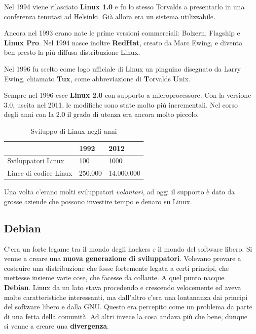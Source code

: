 Nel 1994 viene rilasciato \textbf{Linux 1.0} e fu lo stesso Torvalds a presentarlo in una conferenza tenutasi ad Helsinki. Già allora era un sistema utilizzabile.

Ancora nel 1993 erano nate le prime versioni commerciali: Bolzern, Flagship e \textbf{Linux Pro}. Nel 1994 nasce inoltre \textbf{RedHat}, creato da Marc Ewing, e diventa ben presto la più diffusa distribuzione Linux.

Nel 1996 fu scelto come logo ufficiale di Linux un pinguino disegnato da Larry Ewing, chiamato \textbf{Tux}, come abbreviazione di \textbf{T}orvalds \textbf{U}nix.

Sempre nel 1996 esce \textbf{Linux 2.0} con supporto a microprocessore. Con la versione 3.0, uscita nel 2011, le modifiche sono state molto più incrementali. Nel corso degli anni con la 2.0 il grado di utenza era ancora molto piccolo.

\begin{table}[htpd]
\centering
	\begin{tabular}[c]{l | l | l}
	\hline
	& 1992 & 2012 \\
	\hline
	Sviluppatori Linux & 100 & 1000 \\
	\hline
	Linee di codice Linux & 250.000 & 14.000.000 \\
	\hline
	\end{tabular}
\caption{Sviluppo di Linux negli anni}
\end{table}

Una volta c'erano molti sviluppatori \textit{volontari}, ad oggi il supporto è dato da grosse aziende che possono investire tempo e denaro su Linux.

\subsection{Debian}

C'era un forte legame tra il mondo degli hackers e il mondo del software libero. Si venne a creare una \textbf{nuova generazione di sviluppatori}. Volevano provare a costruire una distribuzione che fosse fortemente legata a certi principi, che mettesse insieme varie cose, che facesse da collante. A quel punto nacque \textbf{Debian}. Linux da un lato stava procedendo e crescendo velocemente ed aveva molte caratteristiche interessanti, ma dall'altro c'era una lontananza dai principi del software libero e dalla GNU. Questo era percepito come un problema da parte di una fetta della comunità. Ad altri invece la cosa andava più che bene, dunque si venne a creare una \textbf{divergenza}. 

